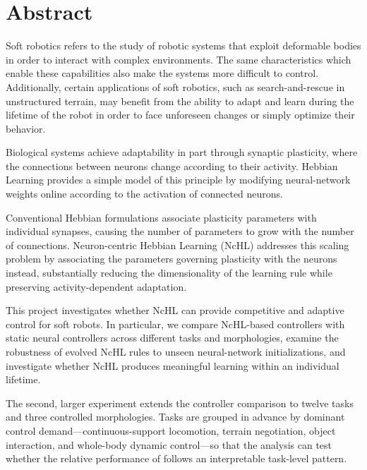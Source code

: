 \chapter*{Abstract}

Soft robotics refers to the study of robotic systems that exploit deformable bodies in order to interact with complex environments. The same characteristics which enable these capabilities also make the systems more difficult to control. Additionally, certain applications of soft robotics, such as search-and-rescue in unstructured terrain, may benefit from the ability to adapt and learn during the lifetime of the robot in order to face unforeseen changes or simply optimize their behavior.

Biological systems achieve adaptability in part through synaptic plasticity, where the connections between neurons change according to their activity. Hebbian Learning provides a simple model of this principle by modifying neural-network weights online according to the activation of connected neurons. 

Conventional Hebbian formulations associate plasticity parameters with individual synapses, causing the number of parameters to grow with the number of connections. Neuron-centric Hebbian Learning (NcHL) addresses this scaling problem by associating the parameters governing plasticity with the neurons instead, substantially reducing the dimensionality of the learning rule while preserving activity-dependent adaptation.

This project investigates whether NcHL can provide competitive and adaptive control for soft robots. In particular, we compare NcHL-based controllers with static neural controllers across different tasks and morphologies, examine the robustness of evolved NcHL rules to unseen neural-network initializations, and investigate whether NcHL produces meaningful learning within an individual lifetime.

The second, larger experiment extends the controller comparison to twelve tasks and three controlled morphologies. Tasks are grouped in advance by dominant control demand---continuous-support locomotion, terrain negotiation, object interaction, and whole-body dynamic control---so that the analysis can test whether the relative performance of \nchl{} follows an interpretable task-level pattern.
